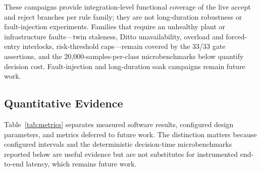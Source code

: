 \documentclass[journal]{IEEEtran}
\begin{document}
These campaigns provide integration-level functional coverage of the live accept and reject branches per rule family; they are not long-duration robustness or fault-injection experiments. Families that require an unhealthy plant or infrastructure faults---twin staleness, Ditto unavailability, overload and forced-entry interlocks, risk-threshold caps---remain covered by the 33/33 gate assertions, and the 20{,}000-samples-per-class microbenchmarks below quantify decision cost. Fault-injection and long-duration soak campaigns remain future work.

\subsection{Quantitative Evidence}

Table~\ref{tab:metrics} separates measured software results, configured design parameters, and metrics deferred to future work. The distinction matters because configured intervals and the deterministic decision-time microbenchmarks reported below are useful evidence but are not substitutes for instrumented end-to-end latency, which remains future work.
\end{document}
